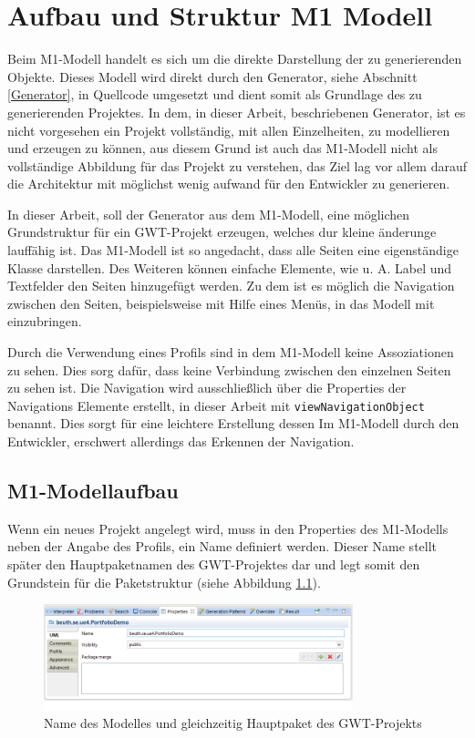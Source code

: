 \chapter{Aufbau und Struktur M1 Modell} \label{M1Modell}
Beim M1-Modell handelt es sich um die direkte Darstellung der zu generierenden
Objekte. Dieses Modell wird direkt durch den Generator, siehe Abschnitt
\ref{Generator}, in Quellcode umgesetzt und dient somit als Grundlage des
zu generierenden Projektes. In dem, in dieser Arbeit, beschriebenen Generator,
ist es nicht vorgesehen ein Projekt vollständig, mit allen Einzelheiten, zu
modellieren und erzeugen zu können, aus diesem Grund ist auch das M1-Modell nicht
als vollständige Abbildung für das Projekt zu verstehen, das Ziel lag vor allem
darauf die Architektur mit möglichst wenig aufwand für den Entwickler zu
generieren.

In dieser Arbeit, soll der Generator aus dem M1-Modell, eine möglichen
Grundstruktur für ein GWT-Projekt erzeugen, welches dur kleine änderunge
lauffähig ist. Das M1-Modell ist so angedacht, dass alle Seiten eine
eigenständige Klasse darstellen. Des Weiteren können einfache Elemente, wie
u. A. Label und Textfelder den Seiten hinzugefügt werden.
Zu dem ist es möglich die Navigation zwischen den Seiten, beispielsweise mit
Hilfe eines Menüs, in das Modell mit einzubringen. 

Durch die Verwendung eines Profils sind in dem M1-Modell keine Assoziationen
zu sehen. Dies sorg dafür, dass keine Verbindung zwischen den einzelnen Seiten
zu sehen ist. Die Navigation wird ausschließlich über die Properties der
Navigations Elemente erstellt, in dieser Arbeit mit
\texttt{viewNavigationObject} benannt. Dies sorgt für eine leichtere Erstellung
dessen Im M1-Modell durch den Entwickler, erschwert allerdings das Erkennen
der Navigation.

\section{M1-Modellaufbau}
Wenn ein neues Projekt angelegt wird, muss in den Properties des M1-Modells
neben der Angabe des Profils, ein Name definiert werden. Dieser Name stellt
später den Hauptpaketnamen des GWT-Projektes dar und legt somit den Grundstein
für die Paketstruktur (siehe Abbildung \ref{Fig:mainpackage}).

\begin{figure}[htbp]
\begin{center}
\includegraphics[width=0.8\textwidth]{./img/ProjectPackage.png}
\caption{Name des Modelles und gleichzeitig Hauptpaket des
GWT-Projekts}\label{Fig:mainpackage}
\end{center}
\end{figure}

